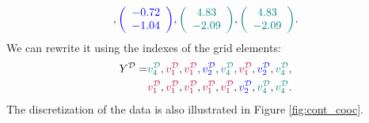 \documentclass[shortabstract]{iithesis}
\begin{document}
\begin{equation*}
\begin{aligned}
, \textcolor{blue}{\left( \begin{array}{c}-0.72\\-1.04\end{array} \right)}
, \textcolor{teal}{\left( \begin{array}{c}4.83\\-2.09\end{array} \right)}
, \textcolor{teal}{\left( \begin{array}{c}4.83\\-2.09\end{array} \right)}\text{.}
 \end{aligned}   
\end{equation*}
We can rewrite it using the indexes of the grid elements:
\begin{equation*}
\begin{aligned}
Y ^{\mathcal D} = &
    \textcolor{teal}{v^{\mathcal D}_4}
, \textcolor{purple}{v^{\mathcal D}_1}
, \textcolor{purple}{v^{\mathcal D}_1}
, \textcolor{blue}{v^{\mathcal D}_2}
, \textcolor{teal}{v^{\mathcal D}_4}
, \textcolor{purple}{v^{\mathcal D}_1}
, \textcolor{blue}{v^{\mathcal D}_2}
, \textcolor{teal}{v^{\mathcal D}_4}
, \\ &  \textcolor{purple}{v^{\mathcal D}_1}
, \textcolor{purple}{v^{\mathcal D}_1}
, \textcolor{purple}{v^{\mathcal D}_1}
, \textcolor{purple}{v^{\mathcal D}_1}
, \textcolor{purple}{v^{\mathcal D}_1}
, \textcolor{blue}{v^{\mathcal D}_2}
, \textcolor{teal}{v^{\mathcal D}_4}
, \textcolor{teal}{v^{\mathcal D}_4}\text{.}
\end{aligned}
\end{equation*}
The discretization of the data is also illustrated in Figure \ref{fig:cont_cooc}.
\end{document}
